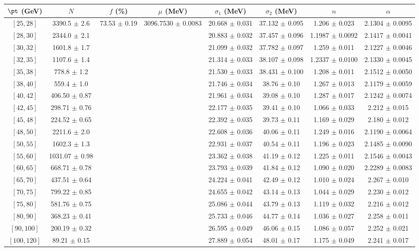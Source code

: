 \begin{tabular}{c||c|c|c|c|c|c|c}
$\pt$ (GeV) & $N$ & $f$ (\%) & $\mu$ (MeV) & $\sigma_1$ (MeV) & $\sigma_2$ (MeV) & $n$ & $\alpha$ \\
\hline
$[25, 28]$ & 3390.5 $\pm$ 2.6 & \multirow{19}{*}{73.53 $\pm$ 0.19} & \multirow{19}{*}{3096.7530 $\pm$ 0.0083} & 20.668 $\pm$ 0.031 & 37.132 $\pm$ 0.095 & 1.206 $\pm$ 0.023 & 2.1304 $\pm$ 0.0095\\
$[28, 30]$ & 2344.0 $\pm$ 2.1 &  &  & 20.883 $\pm$ 0.032 & 37.457 $\pm$ 0.096 & 1.1987 $\pm$ 0.0092 & 2.1417 $\pm$ 0.0041\\
$[30, 32]$ & 1601.8 $\pm$ 1.7 &  &  & 21.099 $\pm$ 0.032 & 37.782 $\pm$ 0.097 & 1.259 $\pm$ 0.011 & 2.1227 $\pm$ 0.0046\\
$[32, 35]$ & 1107.6 $\pm$ 1.4 &  &  & 21.314 $\pm$ 0.033 & 38.107 $\pm$ 0.098 & 1.2337 $\pm$ 0.0100 & 2.1330 $\pm$ 0.0045\\
$[35, 38]$ & 778.8 $\pm$ 1.2 &  &  & 21.530 $\pm$ 0.033 & 38.431 $\pm$ 0.100 & 1.208 $\pm$ 0.011 & 2.1512 $\pm$ 0.0050\\
$[38, 40]$ & 559.4 $\pm$ 1.0 &  &  & 21.746 $\pm$ 0.034 & 38.76 $\pm$ 0.10 & 1.267 $\pm$ 0.013 & 2.1179 $\pm$ 0.0059\\
$[40, 42]$ & 406.50 $\pm$ 0.87 &  &  & 21.961 $\pm$ 0.034 & 39.08 $\pm$ 0.10 & 1.287 $\pm$ 0.017 & 2.1242 $\pm$ 0.0074\\
$[42, 45]$ & 298.71 $\pm$ 0.76 &  &  & 22.177 $\pm$ 0.035 & 39.41 $\pm$ 0.10 & 1.066 $\pm$ 0.033 & 2.212 $\pm$ 0.015\\
$[45, 48]$ & 224.52 $\pm$ 0.65 &  &  & 22.392 $\pm$ 0.035 & 39.73 $\pm$ 0.11 & 1.169 $\pm$ 0.029 & 2.180 $\pm$ 0.012\\
$[48, 50]$ & 2211.6 $\pm$ 2.0 &  &  & 22.608 $\pm$ 0.036 & 40.06 $\pm$ 0.11 & 1.249 $\pm$ 0.016 & 2.1190 $\pm$ 0.0064\\
$[50, 55]$ & 1602.3 $\pm$ 1.3 &  &  & 22.931 $\pm$ 0.037 & 40.54 $\pm$ 0.11 & 1.196 $\pm$ 0.023 & 2.1485 $\pm$ 0.0090\\
$[55, 60]$ & 1031.07 $\pm$ 0.98 &  &  & 23.362 $\pm$ 0.038 & 41.19 $\pm$ 0.12 & 1.225 $\pm$ 0.011 & 2.1546 $\pm$ 0.0043\\
$[60, 65]$ & 668.71 $\pm$ 0.78 &  &  & 23.793 $\pm$ 0.039 & 41.84 $\pm$ 0.12 & 1.090 $\pm$ 0.020 & 2.2289 $\pm$ 0.0083\\
$[65, 70]$ & 437.51 $\pm$ 0.64 &  &  & 24.224 $\pm$ 0.041 & 42.49 $\pm$ 0.12 & 1.010 $\pm$ 0.024 & 2.267 $\pm$ 0.010\\
$[70, 75]$ & 799.22 $\pm$ 0.85 &  &  & 24.655 $\pm$ 0.042 & 43.14 $\pm$ 0.13 & 1.044 $\pm$ 0.029 & 2.230 $\pm$ 0.012\\
$[75, 80]$ & 581.76 $\pm$ 0.75 &  &  & 25.086 $\pm$ 0.044 & 43.79 $\pm$ 0.13 & 1.119 $\pm$ 0.032 & 2.216 $\pm$ 0.012\\
$[80, 90]$ & 368.23 $\pm$ 0.41 &  &  & 25.733 $\pm$ 0.046 & 44.77 $\pm$ 0.14 & 1.036 $\pm$ 0.027 & 2.258 $\pm$ 0.011\\
$[90, 100]$ & 200.19 $\pm$ 0.32 &  &  & 26.595 $\pm$ 0.049 & 46.06 $\pm$ 0.15 & 1.086 $\pm$ 0.057 & 2.252 $\pm$ 0.021\\
$[100, 120]$ & 89.21 $\pm$ 0.15 &  &  & 27.889 $\pm$ 0.054 & 48.01 $\pm$ 0.17 & 1.175 $\pm$ 0.049 & 2.241 $\pm$ 0.017\\
\end{tabular}
